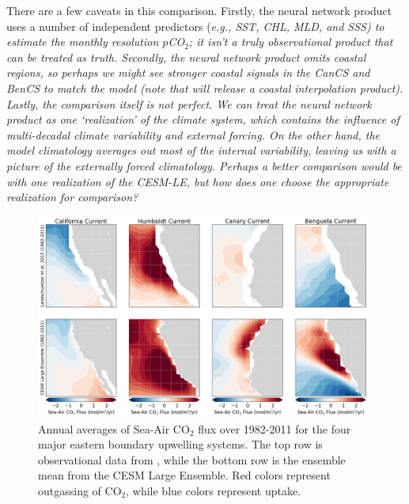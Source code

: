 \documentclass[12pt]{article}
\begin{document}
There are a few caveats in this comparison. Firstly, the neural network product uses a number of independent predictors (\it e.g.\rm, SST, CHL, MLD, and SSS) to estimate the monthly resolution $p$CO$_{2}$; it isn't a truly observational product that can be treated as truth. Secondly, the neural network product omits coastal regions, so perhaps we might see stronger coastal signals in the CanCS and BenCS to match the model (note that \citet{Laruelle2017} will release a coastal interpolation product). Lastly, the comparison itself is not perfect. We can treat the neural network product as one `realization' of the climate system, which contains the influence of multi-decadal climate variability and external forcing. On the other hand, the model climatology averages out most of the internal variability, leaving us with a picture of the externally forced climatology. Perhaps a better comparison would be with one realization of the CESM-LE, but how does one choose the appropriate realization for comparison?
\newpage
\begin{figure}[!h]
	\centering
	\includegraphics[width=\linewidth]{../../figs/all-systems/landschuetzer-model-climatological-comparison.png}
	\caption{Annual averages of Sea-Air CO$_{2}$ flux over 1982-2011 for the four major eastern boundary upwelling systems. The top row is observational data from \citet{Landschutzer2013}, while the bottom row is the ensemble mean from the CESM Large Ensemble. Red colors represent outgassing of CO$_{2}$, while blue colors represent uptake.}
	\label{fig:evaluation}
\end{figure}
\end{document}
